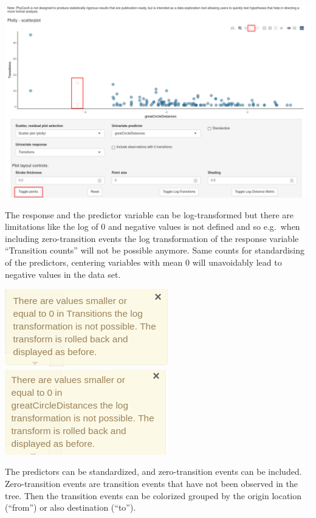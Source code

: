 \documentclass[
]{article}
\begin{document}
\includegraphics{tutorial_img/toggle_points.png}

The response and the predictor variable can be log-transformed but there
are limitations like the log of 0 and negative values is not defined and
so e.g.~when including zero-transition events the log transformation of
the response variable ``Transition counts'' will not be possible
anymore. Same counts for standardising of the predictors, centering
variables with mean 0 will unavoidably lead to negative values in the
data set.

\includegraphics{tutorial_img/WarningLog.png}
\includegraphics{tutorial_img/Warning.png}

The predictors can be standardized, and zero-transition events can be
included. Zero-transition events are transition events that have not
been observed in the tree. Then the transition events can be colorized
grouped by the origin location (``from'') or also destination (``to'').
\end{document}
